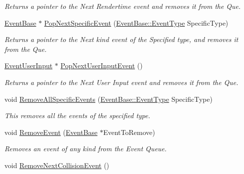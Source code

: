 \begin{DoxyCompactItemize}
\begin{DoxyCompactList}\small\item\em Returns a pointer to the Next Rendertime event and removes it from the Que. \item\end{DoxyCompactList}\item 
\hyperlink{classMezzanine_1_1EventBase}{EventBase} $\ast$ \hyperlink{classMezzanine_1_1EventManager_a1e142f7a2c658e0bbbd3e962ba24f8bb}{PopNextSpecificEvent} (\hyperlink{classMezzanine_1_1EventBase_ab85e31e97753b7e7ecb098f82526baef}{EventBase::EventType} SpecificType)
\begin{DoxyCompactList}\small\item\em Returns a pointer to the Next kind event of the Specified type, and removes it from the Que. \item\end{DoxyCompactList}\item 
\hyperlink{classMezzanine_1_1EventUserInput}{EventUserInput} $\ast$ \hyperlink{classMezzanine_1_1EventManager_a9a372e5988a549f61a1ff064b7239a8e}{PopNextUserInputEvent} ()
\begin{DoxyCompactList}\small\item\em Returns a pointer to the Next User Input event and removes it from the Que. \item\end{DoxyCompactList}\item 
void \hyperlink{classMezzanine_1_1EventManager_a209b69a260ea1a2351e005802d13803b}{RemoveAllSpecificEvents} (\hyperlink{classMezzanine_1_1EventBase_ab85e31e97753b7e7ecb098f82526baef}{EventBase::EventType} SpecificType)
\begin{DoxyCompactList}\small\item\em This removes all the events of the specified type. \item\end{DoxyCompactList}\item 
void \hyperlink{classMezzanine_1_1EventManager_ae3a90f7fdd0b75b4e4ff5e5d3ad3e332}{RemoveEvent} (\hyperlink{classMezzanine_1_1EventBase}{EventBase} $\ast$EventToRemove)
\begin{DoxyCompactList}\small\item\em Removes an event of any kind from the Event Queue. \item\end{DoxyCompactList}\item 
void \hyperlink{classMezzanine_1_1EventManager_ac35a0aa7e6e98a8024025f3babd40749}{RemoveNextCollisionEvent} ()

\end{DoxyCompactItemize}

